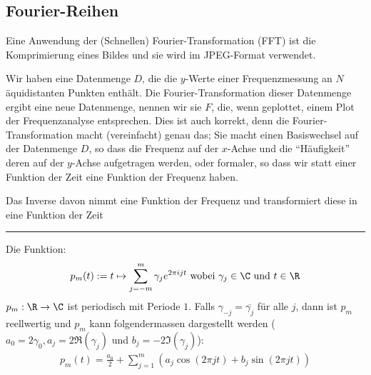 
%
\subsection{Fourier-Reihen}
Eine Anwendung der (Schnellen) Fourier-Transformation (FFT) ist die Komprimierung eines Bildes und sie wird im JPEG-Format verwendet.

\inlineintuition Wir haben eine Datenmenge $D$, die die $y$-Werte einer Frequenzmessung an $N$ äquidistanten Punkten enthält.
Die Fourier-Transformation dieser Datenmenge ergibt eine neue Datenmenge, nennen wir sie $F$, die, wenn geplottet, einem Plot der Frequenzanalyse entsprechen.
Dies ist auch korrekt, denn die Fourier-Transformation macht (vereinfacht) genau das;
Sie macht einen Basiswechsel auf der Datenmenge $D$, so dass die Frequenz auf der $x$-Achse und die ``Häufigkeit'' deren auf der $y$-Achse aufgetragen werden,
oder formaler, so dass wir statt einer Funktion der Zeit eine Funktion der Frequenz haben.

Das Inverse davon nimmt eine Funktion der Frequenz und transformiert diese in eine Funktion der Zeit

\vspace{0.3cm}
\hrule
\vspace{0.2cm}

 Die Funktion:
\rmvspace
\begin{align*}
    p_m(t) := t \mapsto \sum_{j = -m}^{m} \gamma_j e^{2 \pi ijt} \text{ wobei } \gamma_j \in \C \text{ und } t \in \R
\end{align*}
%
%
\inlineremark $p_m : \R \rightarrow \C$ ist periodisch mit Periode $1$.
Falls $\gamma_{-j} = \overline{\gamma_j}$ für alle $j$, dann ist $p_m$ reellwertig und
$p_m$ kann folgendermassen dargestellt werden ($a_0 = 2\gamma_0, a_j = 2\Re(\gamma_j)$ und $b_j = -2\Im(\gamma_j)$):
\rmvspace
\begin{align*}
    p_m(t) = \frac{a_0}{2} + \sum_{j = 1}^{m} (a_j \cos(2\pi jt) + b_j \sin(2\pi jt))
\end{align*}

